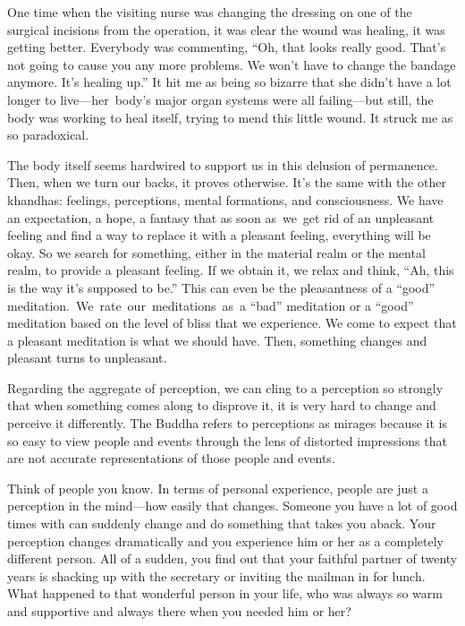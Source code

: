 \enlargethispage{1\baselineskip}
One time when the visiting nurse was changing the dressing on one of the surgical incisions from the operation, it was clear the wound was healing, it was getting better. Everybody was commenting, ``Oh, that looks really good. That's not going to cause you any more problems. We won't have to change the bandage anymore. It's healing up.'' It hit me as being so bizarre that she didn't have a lot longer to live---\mbox{her body's} major organ systems were all failing---but still, the body was working to heal itself, trying to mend this little wound. It struck me as so paradoxical.

The body itself seems hardwired to support us in this delusion of permanence. Then, when we turn our backs, it proves otherwise. It's the same with the other khandhas: feelings, perceptions, mental formations, and consciousness. We have an expectation, a hope, a fantasy that as soon \mbox{as we get} rid of an unpleasant feeling and find a way to replace it with a pleasant feeling, everything will be okay. So we search for something, either in the material realm or the mental realm, to provide a pleasant feeling. If we obtain it, we relax and think, ``Ah, this is the way it's supposed to be.'' This can even be the pleasantness of a ``good'' \mbox{meditation. We rate our meditations as a} ``bad'' meditation or a ``good'' meditation based on the level of bliss that we experience. We come to expect that a pleasant meditation is what we should have. Then, something changes and pleasant turns to unpleasant.

Regarding the aggregate of perception, we can cling to a perception so strongly that when something comes along to disprove it, it is very hard to change and perceive it differently. The Buddha refers to perceptions as mirages because it is so easy to view people and events through the lens of distorted impressions that are not accurate representations of those people and events.

Think of people you know. In terms of personal experience, people are just a perception in the mind---how easily that changes. Someone you have a lot of good times with can suddenly change and do something that takes you aback. Your perception changes dramatically and you experience him or her as a completely different person. All of a sudden, you find out that your faithful partner of twenty years is shacking up with the secretary or inviting the mailman in for lunch. What happened to that wonderful person in your life, who was always so warm and supportive and always there when you needed him or her?

